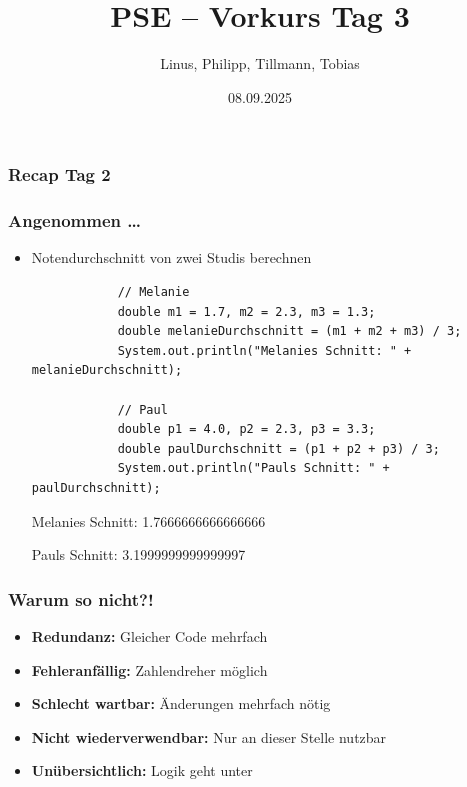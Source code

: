 \documentclass{../../presentation}
\title{PSE – Vorkurs Tag 3}
\author{Linus, Philipp, Tillmann, Tobias}
\institute{FIUS - Fachgruppe Informatik Universität Stuttgart}
\date{08.09.2025}
\begin{document}
\begin{frame}
	\titlepage
\end{frame}

\begin{frame}
	\listoftodos
\end{frame}

\begin{frame}
	\frametitle{Recap Tag 2}
\end{frame}

\begin{frame}[fragile]
	\frametitle{Angenommen \dots}
	\begin{itemize}
		\item\pause Notendurchschnitt von zwei Studis berechnen
		      \begin{verbatim}
            // Melanie
            double m1 = 1.7, m2 = 2.3, m3 = 1.3;
            double melanieDurchschnitt = (m1 + m2 + m3) / 3;
            System.out.println("Melanies Schnitt: " + melanieDurchschnitt);

            // Paul
            double p1 = 4.0, p2 = 2.3, p3 = 3.3;
            double paulDurchschnitt = (p1 + p2 + p3) / 3;
            System.out.println("Pauls Schnitt: " + paulDurchschnitt);
        \end{verbatim}
		      \begin{ausgabe}
			      Melanies Schnitt: 1.7666666666666666

			      Pauls Schnitt: 3.1999999999999997
		      \end{ausgabe}
	\end{itemize}
\end{frame}

\begin{frame}[fragile]
	\frametitle{Warum so nicht?!}
	\begin{itemize}
		\item\pause \textbf{Redundanz:} Gleicher Code mehrfach
		\item\pause \textbf{Fehleranfällig:} Zahlendreher möglich
		\item\pause \textbf{Schlecht wartbar:} Änderungen mehrfach nötig
		\item\pause \textbf{Nicht wiederverwendbar:} Nur an dieser Stelle nutzbar
		\item\pause \textbf{Unübersichtlich:} Logik geht unter
	\end{itemize}
	\vspace{2em}
	\begin{minipage}{\textwidth}
		\centering
		\onslide\pause{\Huge $\rightarrow$~}%
	\end{minipage}
\end{frame}
\end{document}
